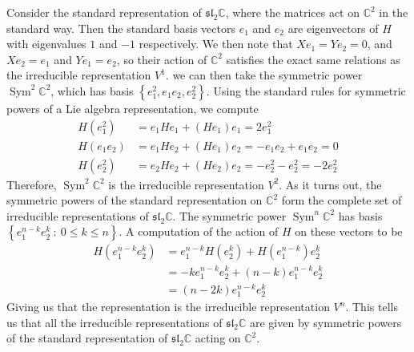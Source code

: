 \documentclass[psamsfonts]{amsart}
\theoremstyle{definition}
\theoremstyle{remark}
\renewcommand{\sl}{\mathfrak{sl}}
\newcommand{\C}{\mathbb{C}}
\newcommand{\set}[1]{\left\lbrace #1 \right\rbrace}
\DeclareMathOperator{\Sym}{Sym}
\begin{document}
Consider the standard representation of $\sl_2\C$, where the matrices
act on $\C^2$ in the standard way. Then the standard basis vectors $e_1$ and $e_2$
are eigenvectors of $H$ with eigenvalues $1$ and $-1$ respectively. We then note
that $Xe_1 = Ye_2 = 0$, and $Xe_2 = e_1$ and $Ye_1 = e_2$, so their action of
$\C^2$ satisfies the exact same relations as the irreducible representation $V^1$.
we can then take the symmetric power $\Sym^2\C^2$, which has basis
$\set{e_1^2, e_1e_2, e_2^2}$. Using the standard rules for symmetric powers
of a Lie algebra representation, we compute
\begin{align*}
H(e_1^2) &= e_1He_1 + (He_1) e_1 = 2e_1^2 \\
H(e_1e_2) &= e_1He_2 + (He_1) e_2 = -e_1e_2 + e_1e_2 = 0 \\
H(e_2^2) &= e_2He_2 + (He_2) e_2 = -e_2^2 - e_2^2 = -2e_2^2
\end{align*}
Therefore, $\Sym^2\C^2$ is the irreducible representation $V^2$. As it turns
out, the symmetric powers of the standard representation on $\C^2$ form the
complete set of irreducible representations of $\sl_2\C$. The symmetric power
$\Sym^n\C^2$ has basis $\set{e_1^{n-k}e_2^k ~:~ 0 \leq k \leq n}$. A computation
of the action of $H$ on these vectors to be
%
\begin{align*}
H(e_1^{n-k}e_2^k) &= e_1^{n-k}H(e_2^k) + H(e_1^{n-k})e_2^k \\
&= -k e_1^{n-k}e_2^k + (n-k)e_1^{n-k}e_2^k \\
&= (n-2k)e_1^{n-k}e_2^k
\end{align*}
%
Giving us that the representation is the irreducible representation $V^n$.
This tells us that all the irreducible representations of $\sl_2\C$ are given by
symmetric powers of the standard representation of $\sl_2\C$ acting on $\C^2$.
%
\end{document}
